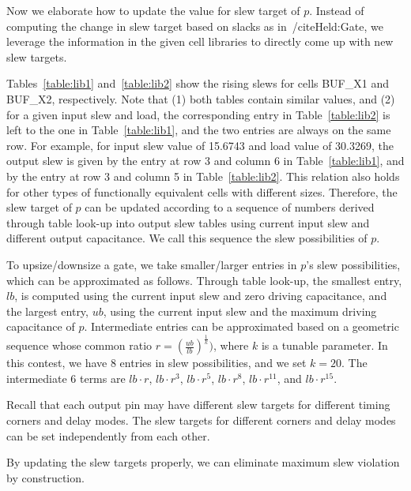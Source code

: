Now we elaborate how to update the value for slew target of $p$. Instead of computing the change in slew target based on slacks as in~/cite{Held:Gate}, we leverage the information in the given cell libraries to directly come up with new slew targets.

Tables~\ref{table:lib1} and~\ref{table:lib2} show the rising slews for cells BUF\_X1 and BUF\_X2, respectively. Note that (1) both tables contain similar values, and (2) for a given input slew and load, the corresponding entry in Table~\ref{table:lib2} is left to the one in Table~\ref{table:lib1}, and the two entries are always on the same row. For example, for input slew value of 15.6743 and load value of 30.3269, the output slew is given by the entry at row 3 and column 6 in Table~\ref{table:lib1}, and by the entry at row 3 and column 5 in Table~\ref{table:lib2}. This relation also holds for other types of functionally equivalent cells with different sizes. Therefore, the slew target of $p$ can be updated according to a sequence of numbers derived through table look-up into output slew tables using current input slew and different output capacitance. We call this sequence the slew possibilities of $p$.

To upsize/downsize a gate, we take smaller/larger entries in $p$'s slew possibilities, which can be approximated as follows. Through table look-up, the smallest entry, $lb$, is computed using the current input slew and zero driving capacitance, and the largest entry, $ub$, using the current input slew and the maximum driving capacitance of $p$. Intermediate entries can be approximated based on a geometric sequence whose common ratio $r = (\frac{ub}{lb})^{\frac{1}{k}})$, where $k$ is a tunable parameter. In this contest, we have 8 entries in slew possibilities, and we set $k = 20$. The intermediate 6 terms are $lb\cdot r$, $lb\cdot r^3$, $lb\cdot r^5$, $lb\cdot r^8$, $lb\cdot r^{11}$, and $lb\cdot r^{15}$.

Recall that each output pin may have different slew targets for different timing corners and delay modes. The slew targets for different corners and delay modes can be set independently from each other.

By updating the slew targets properly, we can eliminate maximum slew violation by construction.

